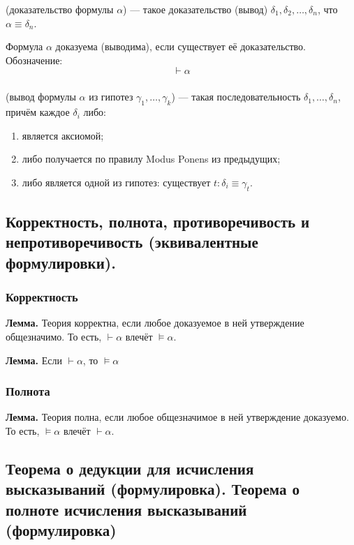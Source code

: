 \documentclass[10pt,a4paper,oneside]{article}
\begin{document}
(доказательство формулы $\alpha$)
--- такое доказательство (вывод) $\delta_1, \delta_2, \dots, \delta_n$,
что $\alpha\equiv\delta_n$.

Формула $\alpha$ доказуема (выводима), если существует её доказательство. Обозначение:
$$\vdash \alpha$$

\subsubsection{}
(вывод формулы $\alpha$ из гипотез $\gamma_1,\dots,\gamma_k$)
    --- такая последовательность
    $\delta_1,\dots,\delta_n$, причём каждое $\delta_i$ либо:
    \begin{enumerate}
    \item является аксиомой;
    \item либо получается по правилу Modus Ponens из предыдущих;
    \item либо является одной из гипотез: существует $t: \delta_i \equiv \gamma_t$.
    \end{enumerate}


\subsection{Корректность, полнота, противоречивость и непротиворечивость (эквивалентные формулировки).}

\subsubsection{Корректность}
\textbf{ Лемма. }
Теория корректна, если любое доказуемое в ней утверждение общезначимо.
То есть, $\vdash\alpha$ влечёт $\models\alpha$.


\noindent \textbf{ Лемма. } Если $\vdash\alpha$, то $\models\alpha$

\subsubsection{Полнота}
\noindent \textbf{ Лемма. } Теория полна, если любое общезначимое в ней утверждение доказуемо.
То есть, $\models\alpha$ влечёт $\vdash\alpha$.

\subsection{Теорема о дедукции для исчисления высказываний (формулировка). Теорема о полноте исчисления высказываний (формулировка)}
\end{document}
